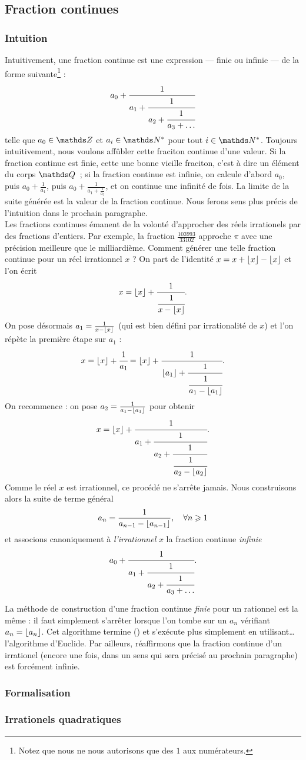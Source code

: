 \subsection{Fraction continues}
\subsubsection{Intuition}

Intuitivement, une fraction continue est une expression — finie ou infinie — de
la forme suivante\footnote{Notez que nous ne nous autorisons que des $1$ aux
numérateurs.} : \[a_0 + \cfrac{1}{a_1 + \cfrac{1}{a_2 + \cfrac{1}{a_3 +
\dots}}}\] telle que $a_0\in \Z$ et $a_i \in \N^*$ pour tout $i\in \N^*$.
Toujours intuitivement, nous voulons affûbler cette fraciton continue d'une
valeur. Si la fraction continue est finie, cette une bonne vieille fraciton,
c'est à dire un élément du corps $\Q$~; si la fraction continue est infinie, on
calcule d'abord $a_0$, puis $a_0 + \frac{1}{a_1}$, puis $a_0 + \frac{1}{a_1
+\frac{1}{a_2}}$, et on continue une infinité de fois. La limite de la suite
générée est la \og{} valeur \fg{} de la fraction continue. Nous ferons sens
plus précis de l'intuition dans le prochain paragraphe. \\

Les fractions continues émanent de la volonté d'approcher des réels irrationels
par des fractions d'entiers. Par exemple, la fraction $\frac{103 993}{33 102}$
approche $\pi$ avec une précision meilleure que le milliardième.  Comment
générer une telle fraction continue pour un réel irrationnel $x$ ?  On part de
l'identité $x = x + \lfloor x\rfloor - \lfloor x\rfloor$ et l'on écrit \[x = \lfloor x\rfloor +
\cfrac{1}{\cfrac{1}{x - \lfloor x\rfloor}}.\] On pose désormais $a_1 = \frac{1}{x -
\lfloor x\rfloor}$ (qui est bien défini par irrationalité de $x$) et l'on répète la
première étape sur $a_1$ : \[x = \lfloor x\rfloor + \cfrac{1}{a_1} = \lfloor x\rfloor +
\cfrac{1}{\lfloor a_1\rfloor + \cfrac{1}{\cfrac{1}{a_1 - \lfloor a_1\rfloor}}}.\] On recommence :
on pose $a_2 = \frac{1}{a_1 - \lfloor a_1\rfloor}$ pour obtenir \[x = \lfloor x\rfloor +
\cfrac{1}{a_1 + \cfrac{1}{a_2 + \cfrac{1}{\cfrac{1}{a_2 - \lfloor a_2\rfloor}}}}.\]
Comme le réel $x$ est irrationnel, ce procédé ne s'arrête jamais. Nous
construisons alors la suite de terme général \[a_n = \frac{1}{a_{n-1} -
\lfloor a_{n-1}\rfloor}, \quad \forall n \geqslant 1\] et associons canoniquement à
\emph{l'irrationnel} $x$ la fraction continue \emph{infinie} \[a_0 +
\cfrac{1}{a_1 + \cfrac{1}{a_2 + \cfrac{1}{a_3 + \dots}}}.\]

\begin{remarque}
	La méthode de construction d'une fraction continue \emph{finie} pour un
	rationnel est la même : il faut simplement s'arrêter lorsque l'on tombe sur
	un $a_n$ vérifiant $a_n = \lfloor a_n\rfloor$. Cet algorithme termine () et
	s'exécute plus simplement en utilisant… l'algorithme d'Euclide. Par
	ailleurs, réaffirmons que la fraction continue d'un irrationel (encore une
	fois, dans un sens qui sera précisé au prochain paragraphe) est forcément
	infinie.
\end{remarque}

\subsubsection{Formalisation}

\subsubsection{Irrationels quadratiques}
